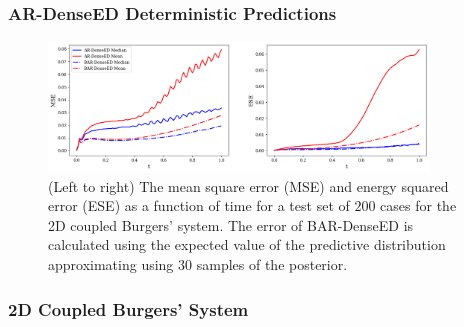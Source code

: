 \documentclass{beamer}
\theoremstyle{remark}
\begin{document}
\begin{frame}
\frametitle{AR-DenseED Deterministic Predictions}
%
\begin{figure}[H]
    \centering
    \includegraphics[width=0.9\textwidth]{Fig20.png}
    \caption{(Left to right) The mean square error (MSE) and energy squared error (ESE) as a function of time for a test set of $200$ cases for the 2D coupled Burgers' system.
    The error of BAR-DenseED is calculated using the expected value of the predictive distribution approximating using $30$ samples of the posterior.}
    \label{fig:burgers2D-MSE}
\end{figure}
\end{frame}

\begin{frame}
\frametitle{2D Coupled Burgers' System}
\begin{table}[H]
    \caption{Wall-clock time of finite element simulation and AR-DenseED to simulate $200$ time-steps of the 2D coupled Burgers' system.
    Wall-clock time estimates were obtained by averaging $10$ independent simulation run times.}
    \label{tab:burger2d-wallclock}
\end{table}
\end{frame}
\end{document}
